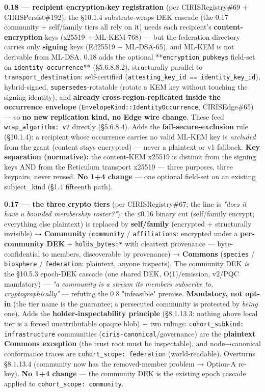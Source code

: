\documentclass[10pt]{article}
\begin{document}
\textbf{0.18 — recipient encryption-key registration} (per CIRISRegistry\#69 + CIRISPersist\#192): the §10.1.4 substrate-wraps DEK cascade (the 0.17 community + self/family tiers all rely on it) needs each recipient's \textbf{content-encryption} keys (x25519 + ML-KEM-768) — but the federation directory carries only \textbf{signing} keys (Ed25519 + ML-DSA-65), and ML-KEM is not derivable from ML-DSA. 0.18 adds the optional **\texttt{encryption\_pubkeys} field-set on \texttt{identity\_occurrence}** (§5.6.8.8.2), structurally parallel to \texttt{transport\_destination}: self-certified (\texttt{attesting\_key\_id == identity\_key\_id}), hybrid-signed, \texttt{supersedes}-rotatable (rotate a KEM key without touching the signing identity), and \textbf{already cross-region-replicated inside the occurrence envelope} (\texttt{EnvelopeKind::IdentityOccurrence}, CIRISEdge\#65) — so \textbf{no new replication kind, no Edge wire change}. These feed \texttt{wrap\_algorithm: v2} directly (§5.6.8.4). Adds the \textbf{fail-secure-exclusion} rule (§10.1.4): a recipient whose occurrence carries no valid ML-KEM key is \textit{excluded} from the grant (content stays encrypted) — never a plaintext or v1 fallback. \textbf{Key separation (normative):} the content-KEM x25519 is distinct from the signing keys AND from the Reticulum transport x25519 — three purposes, three keypairs, never reused. \textbf{No 1+4 change} — one optional field-set on an existing subject\_kind (§1.4 fifteenth path).


\textbf{0.17 — the three crypto tiers} (per CIRISRegistry\#67; the line is \textit{"does it have a bounded membership roster?"}): the ≤0.16 binary cut (self/family encrypt; everything else plaintext) is replaced by \textbf{self/family} (encrypted + structurally invisible) → \textbf{Community} (\texttt{community} / \texttt{affiliations}: encrypted under a \textbf{per-community DEK} + \texttt{holds\_bytes:*} with cleartext provenance — byte-confidential to members, discoverable by provenance) → \textbf{Commons} (\texttt{species} / \texttt{biosphere} / \texttt{federation}: plaintext, anyone inspects). The community DEK \textit{is} the §10.5.3 epoch-DEK cascade (one shared DEK, O(1)/emission, v2/PQC mandatory) — \textit{"a community is a stream its members subscribe to, cryptographically"} — refuting the 0.8 "infeasible" premise. \textbf{Mandatory, not opt-in} (the tier name is the guarantee; a persecuted community is protected by \textit{being} one). Adds the \textbf{holder-inspectability principle} (§8.1.13.3: nothing above local tier is a forced unattributable opaque blob) + two rulings: \texttt{cohort\_subkind: infrastructure} communities (\texttt{ciris-canonical}/governance) are the \textbf{plaintext Commons exception} (the trust root must be inspectable), and node→canonical conformance traces are \texttt{cohort\_scope: federation} (world-readable). Overturns §8.1.13.4 (community now has the removed-member problem → Option-A re-key). \textbf{No 1+4 change} — the community DEK is the existing epoch cascade applied to \texttt{cohort\_scope: community}.
\end{document}

